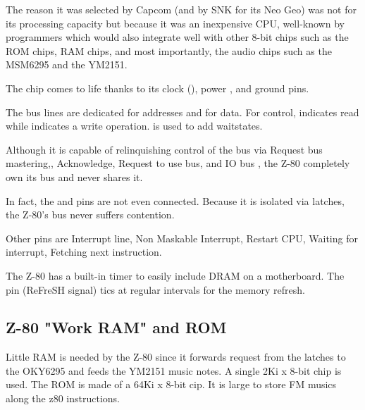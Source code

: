 The reason it was selected by Capcom (and by SNK for its Neo Geo) was not for its processing capacity but because it was an inexpensive CPU, well-known by programmers which would also integrate well with other 8-bit chips such as the ROM chips, RAM chips, and most importantly, the audio chips such as the MSM6295 and the YM2151.






The chip comes to life thanks to its clock (), power , and ground  pins.

The bus lines are dedicated  for addresses and  for data. For control,  indicates read while  indicates a write operation.  is used to add waitstates. 

Although it is capable of relinquishing control of the bus via  Request bus mastering,, Acknowledge,  Request to use bus, and IO bus , the Z-80 completely own its bus and never shares it. 

In fact, the  and  pins are not even connected.  Because it is isolated via latches, the Z-80's bus never suffers contention.


Other pins are  Interrupt line,  Non Maskable Interrupt,  Restart CPU,  Waiting for interrupt,  Fetching next instruction.

\begin{trivia}
 The Z-80 has a built-in timer to easily include DRAM on a motherboard. The  pin (ReFreSH signal) tics at regular intervals for the memory refresh.
\end{trivia}

\subsection{Z-80 "Work RAM" and ROM}
Little RAM is needed by the Z-80 since it forwards request from the latches to the OKY6295 and feeds the YM2151 music notes. A  single 2Ki x 8-bit  chip is used. The ROM is made of a 64Ki x 8-bit  cip. It is large to store FM musics along the z80 instructions. 



